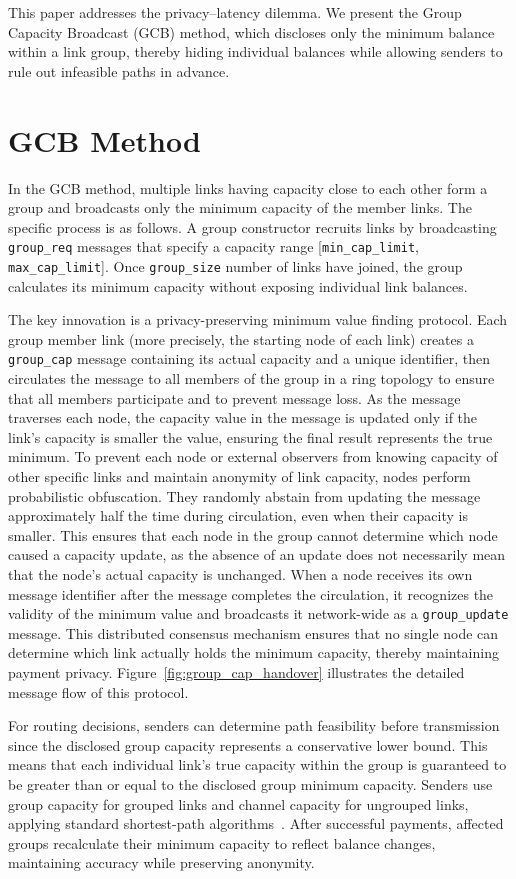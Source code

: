 \documentclass[conference]{IEEEtran}
\newcommand{\groupcap}{\texttt{group\_cap}}
\newcommand{\groupupdate}{\texttt{group\_update}}
\newcommand{\groupreq}{\texttt{group\_req}}
\newcommand{\groupsize}{\texttt{group\_size}}
\newcommand{\mincaplimit}{\texttt{min\_cap\_limit}}
\newcommand{\maxcaplimit}{\texttt{max\_cap\_limit}}
\begin{document}
This paper addresses the privacy–latency dilemma.
We present the Group Capacity Broadcast (GCB) method, which discloses only the minimum balance within a link group, thereby hiding individual balances while allowing senders to rule out infeasible paths in advance.

\section{GCB Method}

In the GCB method, multiple links having capacity close to each other form a group and broadcasts only the minimum capacity of the member links.
The specific process is as follows.
A group constructor recruits links by broadcasting \groupreq{} messages that specify a capacity range [\mincaplimit{}, \maxcaplimit{}].
Once \groupsize{} number of links have joined, the group calculates its minimum capacity without exposing individual link balances.

The key innovation is a privacy-preserving minimum value finding protocol.
Each group member link (more precisely, the starting node of each link) creates a \groupcap{} message containing its actual capacity and a unique identifier, then circulates the message to all members of the group in a ring topology to ensure that all members participate and to prevent message loss.
As the message traverses each node, the capacity value in the message is updated only if the link's capacity is smaller the value, ensuring the final result represents the true minimum.
To prevent each node or external observers from knowing capacity of other specific links and maintain anonymity of link capacity, nodes perform probabilistic obfuscation.
They randomly abstain from updating the message approximately half the time during circulation, even when their capacity is smaller.
This ensures that each node in the group cannot determine which node caused a capacity update, as the absence of an update does not necessarily mean that the node's actual capacity is unchanged.
When a node receives its own message identifier after the message completes the circulation, it recognizes the validity of the minimum value and broadcasts it network-wide as a \groupupdate{} message.
This distributed consensus mechanism ensures that no single node can determine which link actually holds the minimum capacity, thereby maintaining payment privacy.
Figure~\ref{fig:group_cap_handover} illustrates the detailed message flow of this protocol.

For routing decisions, senders can determine path feasibility before transmission since the disclosed group capacity represents a conservative lower bound.
This means that each individual link's true capacity within the group is guaranteed to be greater than or equal to the disclosed group minimum capacity.
Senders use group capacity for grouped links and channel capacity for ungrouped links, applying standard shortest-path algorithms~\cite{lnd,eclair,clightning}.
After successful payments, affected groups recalculate their minimum capacity to reflect balance changes, maintaining accuracy while preserving anonymity.
\end{document}
